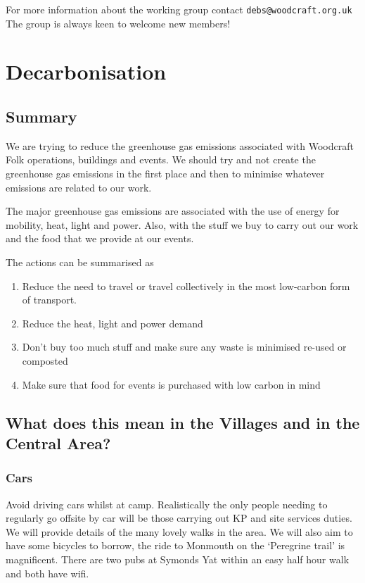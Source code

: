 \documentclass[a4paper, 11pt]{report}
\begin{document}
For more information about the working group contact \texttt{debs@woodcraft.org.uk} The group is always keen to welcome new members!

\chapter{Decarbonisation}
\section{Summary}
We are trying to reduce the greenhouse gas emissions associated with Woodcraft Folk operations, buildings and events. We should try and not create the greenhouse gas emissions in the first place and then to minimise whatever emissions are related to our work.\nl

The major greenhouse gas emissions are associated with the use of energy for mobility, heat, light and power. Also, with the stuff we buy to carry out our work and the food that we provide at our events.\nl

The actions can be summarised as
\begin{enumerate}
    \item Reduce the need to travel or travel collectively in the most low-carbon form of transport.
    \item Reduce the heat, light and power demand
    \item Don't buy too much stuff and make sure any waste is minimised re-used or composted
    \item Make sure that food for events is purchased with low carbon in mind
\end{enumerate}

\section{What does this mean in the Villages and in the Central Area?}
\subsection{Cars}
Avoid driving cars whilst at camp. Realistically the only people needing to regularly go offsite by car will be those carrying out KP and site services duties. We will provide details of the many lovely walks in the area. We will also aim to have some bicycles to borrow, the ride to Monmouth on the `Peregrine trail' is magnificent. There are two pubs at Symonds Yat within an easy half hour walk and both have wifi.
\end{document}
